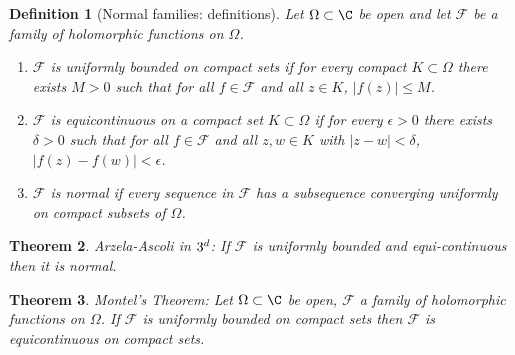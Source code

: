 \documentclass[a4paper]{article}
\newtheorem{thm}{Theorem}[section]
\newtheorem{defn}[thm]{Definition}
\begin{document}
\begin{defn}[Normal families: definitions]
    Let $\Omega\subset \C$ be open and let $\mathcal{F}$ be a family of holomorphic functions on $\Omega$.
    \begin{enumerate}
        \item $\mathcal{F}$ is \emph{uniformly bounded on compact sets} if for every compact $K\subset\Omega$ there exists $M>0$ such that for all $f\in\mathcal{F}$ and all $z\in K$, $|f(z)|\leq M$.
        \item $\mathcal{F}$ is \emph{equicontinuous on a compact set} $K\subset\Omega$ if for every $\epsilon>0$ there exists $\delta>0$ such that for all $f\in\mathcal{F}$ and all $z,w\in K$ with $|z-w|<\delta$, $|f(z)-f(w)|<\epsilon$.
        \item $\mathcal{F}$ is \emph{normal} if every sequence in $\mathcal{F}$ has a subsequence converging uniformly on compact subsets of $\Omega$.
    \end{enumerate}
\end{defn}
\begin{thm}
    Arzela-Ascoli in $3^d$: If $\mathcal{F}$ is uniformly bounded and equi-continuous then it is normal.
\end{thm}
\begin{thm}
    Montel's Theorem: Let $\Omega\subset \C$ be open, $\mathcal{F}$ a family of holomorphic functions on $\Omega$. If $\mathcal{F}$ is uniformly bounded on compact sets then $\mathcal{F}$ is equicontinuous on compact sets. 
\end{thm}
\newpage
\end{document}
